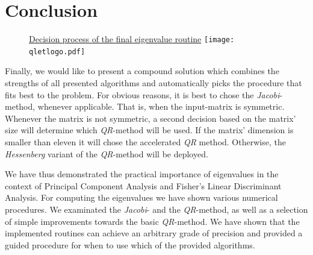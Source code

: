 \documentclass[12pt]{article}
\begin{document}
\section{Conclusion}
\begin{figure}
\centering
\caption{\href {https://github.com/thsis/NIS18/tree/master/algorithms/eigen.py}{Decision process of the final eigenvalue routine}  \protect\texttt{[image: qletlogo.pdf]}}
\end{figure}

Finally, we would like to present a compound solution which combines the strengths of all presented algorithms and automatically picks the procedure that fits best to the problem. For obvious reasons, it is best to chose the \textit{Jacobi}-method, whenever applicable. That is, when the input-matrix is symmetric. Whenever the matrix is not symmetric, a second decision based on the matrix' size will determine which \textit{QR}-method will be used. If the matrix' dimension is smaller than eleven it will chose the accelerated \textit{QR} method. Otherwise, the \textit{Hessenberg} variant of the \textit{QR}-method will be deployed.

We have thus demonstrated the practical importance of eigenvalues in the context of Principal Component Analysis and Fisher's Linear Discriminant Analysis. For computing the eigenvalues we have shown various numerical procedures. We examinated the \textit{Jacobi}- and the \textit{QR}-method, as well as a selection of simple improvements towards the basic \textit{QR}-method. We have shown that the implemented routines can achieve an arbitrary grade of precision and provided a guided procedure for when to use which of the provided algorithms.
\end{document}
